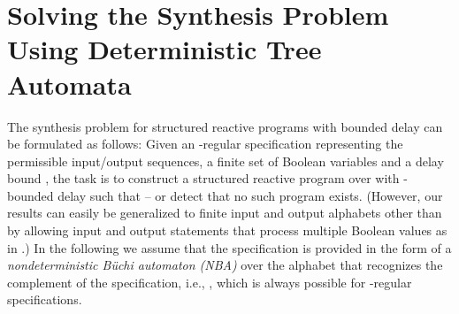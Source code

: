 \documentclass[submission,copyright,creativecommons]{eptcs}
\begin{document}
\section{Solving the Synthesis Problem Using Deterministic Tree Automata}

The synthesis problem for structured reactive programs with bounded delay
can be formulated as follows:
Given an -regular specification
 representing
the permissible input/output sequences,
a finite set of Boolean variables  and a delay bound ,
the task is to construct a structured reactive program  over  with
-bounded delay such that  -- or detect that
no such program exists.
(However, our results can easily be generalized to finite input and
output alphabets other than  by allowing input and output
statements that process multiple Boolean values as in
\cite{madhusudan:LIPIcs:2011:3247}.)
In the following we assume that the specification  is provided in the
form of a \emph{nondeterministic Büchi automaton (NBA)} 
over the alphabet  that recognizes the
complement of the specification, i.e.,
,
which is always possible for -regular specifications.
\end{document}
